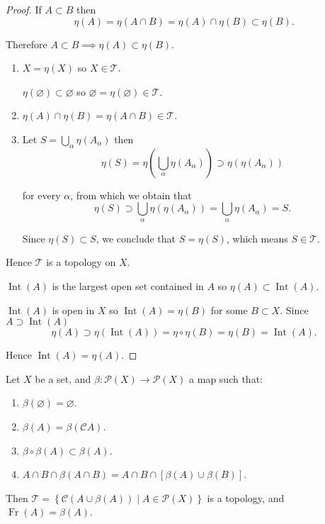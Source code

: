\begin{proof}
    If \( A \subset B \) then
    \[
        \eta(A) = \eta(A \cap B) = \eta(A) \cap \eta(B) \subset \eta(B).
    \]

    Therefore \( A \subset B \implies \eta(A) \subset \eta(B) \).
    \begin{enumerate}[label={(\roman*)}]
        \item \( X = \eta(X) \) so \( X \in \mathscr{T} \).

              \( \eta(\varnothing) \subset \varnothing \) so \( \varnothing = \eta(\varnothing) \in \mathscr{T} \).
        \item \( \eta(A) \cap \eta(B) = \eta(A \cap B) \in \mathscr{T} \).
        \item Let \( S = \bigcup_{\alpha} \eta(A_{\alpha}) \) then
              \[
                  \eta(S) = \eta\left( \bigcup_{\alpha} \eta(A_{\alpha}) \right) \supset \eta(\eta(A_{\alpha}))
              \]

              for every \(\alpha\), from which we obtain that
              \[
                  \eta(S) \supset \bigcup_{\alpha}\eta(\eta(A_{\alpha})) = \bigcup_{\alpha} \eta(A_{\alpha}) = S.
              \]

              Since \( \eta(S) \subset S \), we conclude that \( S = \eta(S) \), which means \( S \in \mathscr{T} \).
    \end{enumerate}

    Hence \( \mathscr{T} \) is a topology on \(X\).

    \( \operatorname{Int}(A) \) is the largest open set contained in \( A \) so \( \eta(A) \subset \operatorname{Int}(A) \).

    \( \operatorname{Int}(A) \) is open in \(X\) so \( \operatorname{Int}(A) = \eta(B) \) for some \( B \subset X \). Since \( A \supset \operatorname{Int}(A) \)
    \[
        \eta(A) \supset \eta(\operatorname{Int}(A)) = \eta\circ\eta(B) = \eta(B) = \operatorname{Int}(A).
    \]

    Hence \( \operatorname{Int}(A) = \eta(A) \).
\end{proof}

\begin{proposition}{5.4}
    Let \(X\) be a set, and \( \beta: \mathscr{P}(X) \to \mathscr{P}(X) \) a map such that:
    \begin{enumerate}[label={(\arabic*)}]
        \item \( \beta(\varnothing) = \varnothing \).
        \item \( \beta(A) = \beta(\mathscr{C}A) \).
        \item \( \beta \circ \beta(A) \subset \beta(A) \).
        \item \( A \cap B \cap \beta(A \cap B) = A \cap B \cap \left[\beta(A) \cup \beta(B)\right] \).
    \end{enumerate}

    Then \( \mathscr{T} = \left\{ \mathscr{C}(A \cup \beta(A)) \mid A \in \mathscr{P}(X) \right\} \) is a topology, and \( \operatorname{Fr}(A) = \beta(A) \).
\end{proposition}

